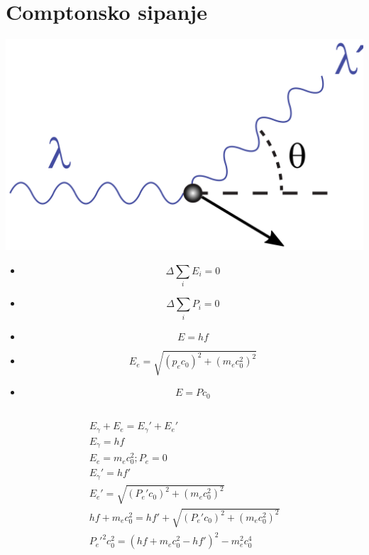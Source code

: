 \documentclass[a4paper,12pt]{article}
\begin{document}
\newpage
\section{Comptonsko sipanje}
\includegraphics[width=\textwidth]{compton.png}

\begin{itemize}[itemsep=-15pt]
    \item $$\Delta \sum_{i}E_i = 0$$
    \item $$ \Delta \sum_{i}P_i = 0$$
    \item $$ E = hf$$
    \item $$ E_e = \sqrt{(p_e c_0)^2 + (m_e c_0^2)^2}$$
    \item $$ E = P c_0$$
\end{itemize}

\subsection{}
\begin{align}
    E_\gamma + E_e = E_\gamma' + E_e' \\
    E_\gamma = hf \\
    E_e = m_e c_0^2; P_e = 0 \\
    E_\gamma' = hf' \\
    E_e' = \sqrt{(P_e' c_0)^2 + (m_e c_0^2)^2} \\
    hf + m_e c_0^2 = hf' + \sqrt{(P_e' c_0)^2 + (m_e c_0^2)^2} \\
    P_e'^2 c_0^2 = (hf + m_e c_0^2 - hf')^2 - m_e^2 c_0^4
\end{align}
\end{document}
